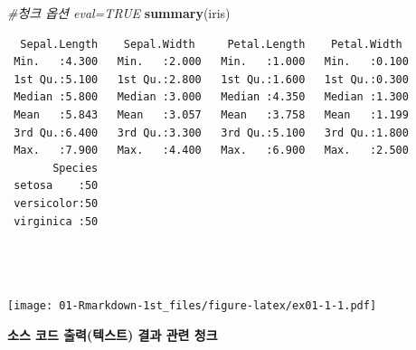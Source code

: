 \documentclass[
  11pt,
]{krantz}
\newenvironment{Shaded}{\begin{snugshade}}{\end{snugshade}}
\newcommand{\CommentTok}[1]{\textcolor[rgb]{0.37,0.37,0.37}{\textit{#1}}}
\newcommand{\KeywordTok}[1]{\textcolor[rgb]{0.27,0.27,0.27}{\textbf{#1}}}
\newcommand{\NormalTok}[1]{#1}
\newcommand{\OperatorTok}[1]{\textcolor[rgb]{0.43,0.43,0.43}{\textbf{#1}}}
\begin{document}
\footnotesize

\begin{Shaded}
\begin{Highlighting}[]
\CommentTok{#청크 옵션 eval=TRUE}
\KeywordTok{summary}\NormalTok{(iris)}
\end{Highlighting}
\end{Shaded}

\begin{verbatim}
  Sepal.Length    Sepal.Width     Petal.Length    Petal.Width   
 Min.   :4.300   Min.   :2.000   Min.   :1.000   Min.   :0.100  
 1st Qu.:5.100   1st Qu.:2.800   1st Qu.:1.600   1st Qu.:0.300  
 Median :5.800   Median :3.000   Median :4.350   Median :1.300  
 Mean   :5.843   Mean   :3.057   Mean   :3.758   Mean   :1.199  
 3rd Qu.:6.400   3rd Qu.:3.300   3rd Qu.:5.100   3rd Qu.:1.800  
 Max.   :7.900   Max.   :4.400   Max.   :6.900   Max.   :2.500  
       Species  
 setosa    :50  
 versicolor:50  
 virginica :50  
                
                
                
\end{verbatim}

\begin{Shaded}
\end{Shaded}

\texttt{[image: 01-Rmarkdown-1st\_files/figure-latex/ex01-1-1.pdf]}

\normalsize

\footnotesize

\begin{Shaded}
\end{Shaded}

\normalsize

\textbf{소스 코드 출력(텍스트) 결과 관련 청크}

\footnotesize
\end{document}
